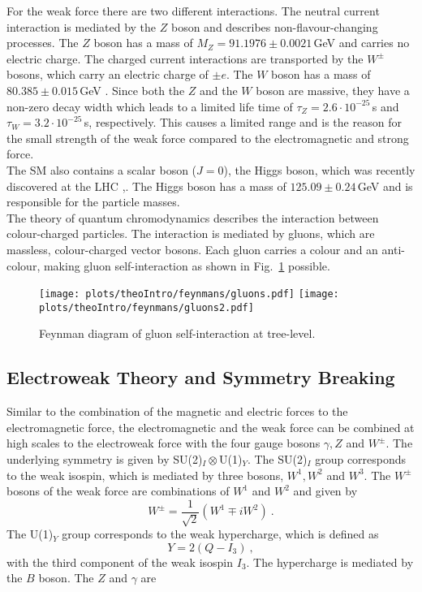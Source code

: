 For the weak force there are two different interactions. The neutral current interaction is mediated by the $Z$ boson and describes non-flavour-changing processes. The $Z$ boson has a mass of $M_Z=91.1976 \pm 0.0021$\,GeV \cite{SMmasses} and carries no electric charge. The charged current interactions are transported by the $W^\pm$ bosons, which carry an electric charge of $\pm e$. The $W$ boson has a mass of $80.385 \pm 0.015$\,GeV \cite{SMmasses}. Since both the $Z$ and the $W$ boson are massive, they have a non-zero decay width which leads to a limited life time of $\tau_Z=2.6\cdot 10^{-25}$\,s and $\tau_W=3.2\cdot 10^{-25}$\,s, respectively. This causes a limited range and is the reason for the small strength of the weak force compared to the electromagnetic and strong force.\\ 
The SM also contains a scalar boson ($J=0$), the Higgs boson, which was recently discovered at the LHC \cite{cms_higgsdiscov},\cite{atlas_higgsdiscov}. The Higgs boson has a mass of $125.09 \pm 0.24$\,GeV and is responsible for the particle masses.\\


The theory of quantum chromodynamics describes the interaction between colour-charged particles. The interaction is mediated by gluons, which are massless, colour-charged vector bosons. Each gluon carries a colour and an anti-colour, making gluon self-interaction as shown in Fig.~\ref{fig:theo:gluoncoupling} possible.
\begin{figure}
	\centering
	\texttt{[image: plots/theoIntro/feynmans/gluons.pdf]}
	\texttt{[image: plots/theoIntro/feynmans/gluons2.pdf]}
	\caption[Feynman diagram of gluon self-interaction at tree-level]{Feynman diagram of gluon self-interaction at tree-level.}
	\label{fig:theo:gluoncoupling}
\end{figure}



\subsection{Electroweak Theory and Symmetry Breaking}
Similar to the combination of the magnetic and electric forces to the electromagnetic force, the electromagnetic and the weak force can be combined at high scales to the electroweak force \cite{EWK} with the four gauge bosons $\gamma , Z$ and $W^\pm$. The underlying symmetry is given by SU(2)$_I\otimes$U(1)$_Y$. The SU(2)$_I$ group corresponds to the weak isospin, which is mediated by three bosons, $W^1,W^2$ and $W^3$. The $W^\pm$ bosons of the weak force are combinations of $W^1$ and $W^2$ and given by
\begin{equation}
W^\pm=\frac{1}{\sqrt{2}}\left( W^1 \mp iW^2 \right) ~.
\end{equation}  
The U(1)$_Y$ group corresponds to the weak hypercharge, which is defined as
\begin{equation}
Y=2(Q-I_3) ~,
\end{equation}
with the third component of the weak isospin $I_3$. The hypercharge is mediated by the $B$ boson. The $Z$ and $\gamma$ are  


